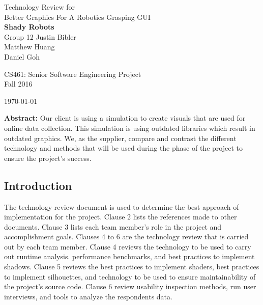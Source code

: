 \onecolumn

\begin{titlepage}
\null
\vspace{20mm}

\begin{flushleft}
\begin{bfseries}
	\vskip2mm
	\Huge{Technology Review for\\ Better Graphics For A Robotics Grasping GUI}\\
	\vspace{30mm}
	\textbf{\huge Shady Robots} \\
	\vskip2mm
	\large{Group 12}
	\vskip5mm
	\Large{Justin Bibler \\
	Matthew Huang \\
	Daniel Goh \\}
\end{bfseries}

\vspace{15mm}
\Large{CS461: Senior Software Engineering Project} \\
\Large{Fall 2016} \\

\vspace{10mm}

\today

\vfill

\begin{normalsize}
{\bf Abstract:}
Our client is using a simulation to create visuals that are used for online data collection.
This simulation is using outdated libraries which result in outdated graphics.
We, as the supplier, compare and contrast the different technology and methods that will be used during the phase of the project to ensure the project's success.
\end{normalsize}
\end{flushleft}
\end{titlepage}

\subsection{Introduction}
\vspace{3mm}
The technology review document is used to determine the best approach of implementation for the project. 
Clause 2 lists the references made to other documents.
Clause 3 lists each team member's role in the project and accomplishment goals.
Clauses 4 to 6 are the technology review that is carried out by each team member.
Clause 4 reviews the technology to be used to carry out runtime analysis. performance benchmarks, and best practices to implement shadows.
Clause 5 reviews the best practices to implement shaders, best practices to implement silhouettes, and technology to be used to ensure maintainability of the project's source code.
Clause 6 review usability inspection methods, run user interviews, and tools to analyze the respondents data.

